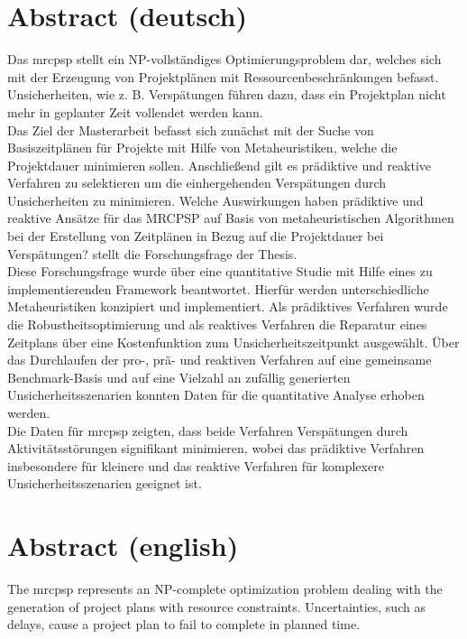 \chapter*{Abstract (deutsch)}
\thispagestyle{empty}
Das \acf{mrcpsp} stellt ein NP-vollständiges Optimierungsproblem dar, welches sich mit der Erzeugung von Projektplänen mit Ressourcenbeschränkungen befasst. Unsicherheiten, wie z. B. Verspätungen führen dazu, dass ein Projektplan nicht mehr in geplanter Zeit vollendet werden kann. \\

Das Ziel der Masterarbeit befasst sich zunächst mit der Suche von Basiszeitplänen für Projekte mit Hilfe von Metaheuristiken, welche die Projektdauer minimieren sollen. Anschließend gilt es prädiktive und reaktive Verfahren zu selektieren um die einhergehenden Verspätungen durch Unsicherheiten zu minimieren. \glqq Welche Auswirkungen haben prädiktive und reaktive Ansätze für das MRCPSP auf Basis von metaheuristischen Algorithmen bei der Erstellung von Zeitplänen in Bezug auf die Projektdauer bei Verspätungen?\grqq{} stellt die Forschungsfrage der Thesis. \\

Diese Forschungsfrage wurde über eine quantitative Studie mit Hilfe eines zu implementierenden Framework beantwortet. Hierfür werden unterschiedliche Metaheuristiken konzipiert und implementiert. Als prädiktives Verfahren wurde die Robustheitsoptimierung und als reaktives Verfahren die Reparatur eines Zeitplans über eine Kostenfunktion zum Unsicherheitszeitpunkt ausgewählt. Über das Durchlaufen der pro-, prä- und reaktiven Verfahren auf eine gemeinsame Benchmark-Basis und auf eine Vielzahl an zufällig generierten Unsicherheitsszenarien konnten Daten für die quantitative Analyse erhoben werden. \\

Die Daten für \acf{mrcpsp} zeigten, dass beide Verfahren Verspätungen durch Aktivitätsstörungen signifikant minimieren, wobei das prädiktive Verfahren insbesondere für kleinere und das reaktive Verfahren für komplexere Unsicherheitsszenarien geeignet ist. 

\chapter*{Abstract (english)}
\thispagestyle{empty}
The \acf{mrcpsp} represents an NP-complete optimization problem dealing with the generation of project plans with resource constraints. Uncertainties, such as delays, cause a project plan to fail to complete in planned time. \\

